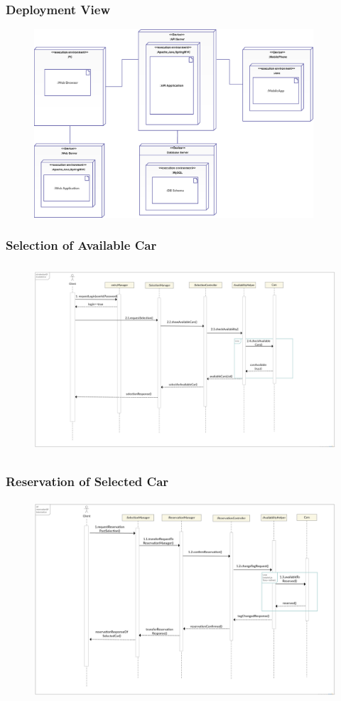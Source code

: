 \begin{frame}
	\frametitle{Deployment View}
	\begin{figure}[H]
		\centering
		\includegraphics[height=7cm,keepaspectratio]{figures/deployment_view.eps}
		\label{fig:deployment_view}
	\end{figure}
\end{frame}

\begin{frame}
	\frametitle{Selection of Available Car}
	\begin{figure}[H]
		\centering
		\includegraphics[height=7cm,keepaspectratio]{figures/selection_available_car_runtime.eps}
		\label{fig:selection_available_car}
	\end{figure}
\end{frame}

\begin{frame}
	\frametitle{Reservation of Selected Car}
	\begin{figure}[H]
		\centering
		\includegraphics[height=7.3cm,keepaspectratio]{figures/reservation_runtime.eps}
		\label{fig:reservation_runtime}
	\end{figure}
\end{frame}

